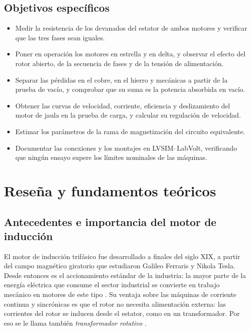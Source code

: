 \documentclass[conference]{IEEEtran}
\begin{document}
\subsection{Objetivos específicos}
\begin{itemize}
\item Medir la resistencia de los devanados del estator de ambos motores y verificar que las tres fases sean iguales.
\item Poner en operación los motores en estrella y en delta, y observar el efecto del rotor abierto, de la secuencia de fases y de la tensión de alimentación.
\item Separar las pérdidas en el cobre, en el hierro y mecánicas a partir de la prueba de vacío, y comprobar que su suma es la potencia absorbida en vacío.
\item Obtener las curvas de velocidad, corriente, eficiencia y deslizamiento del motor de jaula en la prueba de carga, y calcular su regulación de velocidad.
\item Estimar los parámetros de la rama de magnetización del circuito equivalente.
\item Documentar las conexiones y los montajes en LVSIM--LabVolt, verificando que ningún ensayo supere los límites nominales de las máquinas.
\end{itemize}

\section{Reseña y fundamentos teóricos}

\subsection{Antecedentes e importancia del motor de inducción}
El motor de inducción trifásico fue desarrollado a finales del siglo XIX, a partir del campo magnético giratorio que estudiaron Galileo Ferraris y Nikola Tesla. Desde entonces es el accionamiento estándar de la industria: la mayor parte de la energía eléctrica que consume el sector industrial se convierte en trabajo mecánico en motores de este tipo \cite{chapman,fraile}. Su ventaja sobre las máquinas de corriente continua y sincrónicas es que el rotor no necesita alimentación externa: las corrientes del rotor se inducen desde el estator, como en un transformador. Por eso se le llama también \emph{transformador rotativo} \cite{diapositivas}.
\end{document}

